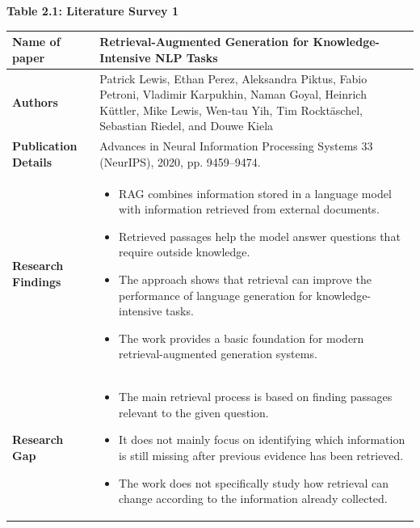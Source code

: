\documentclass[12pt,a4paper]{report}
\begin{document}
\begin{center}\textbf{Table 2.1: Literature Survey 1}\end{center}\label{tab:lit1}
\begin{longtable}{|p{1.25in}|p{5.15in}|}
\hline
\textbf{Name of paper} & Retrieval-Augmented Generation for Knowledge-Intensive NLP Tasks \cite{lewis2020rag} \\ \hline

\textbf{Authors} & Patrick Lewis, Ethan Perez, Aleksandra Piktus, Fabio Petroni, Vladimir Karpukhin, Naman Goyal, Heinrich K\"uttler, Mike Lewis, Wen-tau Yih, Tim Rockt\"aschel, Sebastian Riedel, and Douwe Kiela \\ \hline

\textbf{Publication Details} & Advances in Neural Information Processing Systems 33 (NeurIPS), 2020, pp. 9459--9474. \\ \hline

\textbf{Research Findings} &
\begin{itemize}[leftmargin=0.18in,itemsep=0.05in,topsep=0pt,parsep=0pt]
\item RAG combines information stored in a language model with information retrieved from external documents.
\item Retrieved passages help the model answer questions that require outside knowledge.
\item The approach shows that retrieval can improve the performance of language generation for knowledge-intensive tasks.
\item The work provides a basic foundation for modern retrieval-augmented generation systems.
\end{itemize} \\ \hline

\textbf{Research Gap} &
\begin{itemize}[leftmargin=0.18in,itemsep=0.05in,topsep=0pt,parsep=0pt]
\item The main retrieval process is based on finding passages relevant to the given question.
\item It does not mainly focus on identifying which information is still missing after previous evidence has been retrieved.
\item The work does not specifically study how retrieval can change according to the information already collected.
\end{itemize} \\ \hline


\end{longtable}
\end{document}
